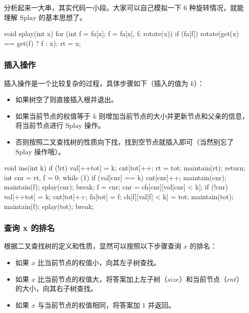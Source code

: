 分析起来一大串，其实代码一小段。大家可以自己模拟一下 $6$ 种旋转情况，就能理解 $\text{Splay}$ 的基本思想了。

\begin{cppcode}
void splay(int x) {
  for (int f = fa[x]; f = fa[x], f; rotate(x))
    if (fa[f]) rotate(get(x) == get(f) ? f : x);
  rt = x;
}
\end{cppcode}

\subsubsection{插入操作}

插入操作是一个比较复杂的过程，具体步骤如下（插入的值为 $k$）：

\begin{itemize}
\item 如果树空了则直接插入根并退出。
\item 如果当前节点的权值等于 $k$ 则增加当前节点的大小并更新节点和父亲的信息，将当前节点进行 $\text{Splay}$ 操作。
\item 否则按照二叉查找树的性质向下找，找到空节点就插入即可（当然别忘了 $\text{Splay}$ 操作哦）。
\end{itemize}

\begin{cppcode}
void ins(int k) {
  if (!rt) {
    val[++tot] = k;
    cnt[tot]++;
    rt = tot;
    maintain(rt);
    return;
  }
  int cnr = rt, f = 0;
  while (1) {
    if (val[cnr] == k) {
      cnt[cnr]++;
      maintain(cnr);
      maintain(f);
      splay(cnr);
      break;
    }
    f = cnr;
    cnr = ch[cnr][val[cnr] < k];
    if (!cnr) {
      val[++tot] = k;
      cnt[tot]++;
      fa[tot] = f;
      ch[f][val[f] < k] = tot;
      maintain(tot);
      maintain(f);
      splay(tot);
      break;
    }
  }
}
\end{cppcode}

\subsubsection{查询 x 的排名}

根据二叉查找树的定义和性质，显然可以按照以下步骤查询 $x$ 的排名：

\begin{itemize}
\item 如果 $x$ 比当前节点的权值小，向其左子树查找。
\item 如果 $x$ 比当前节点的权值大，将答案加上左子树（$size$）和当前节点（$cnt$）的大小，向其右子树查找。
\item 如果 $x$ 与当前节点的权值相同，将答案加 $1$ 并返回。
\end{itemize}

